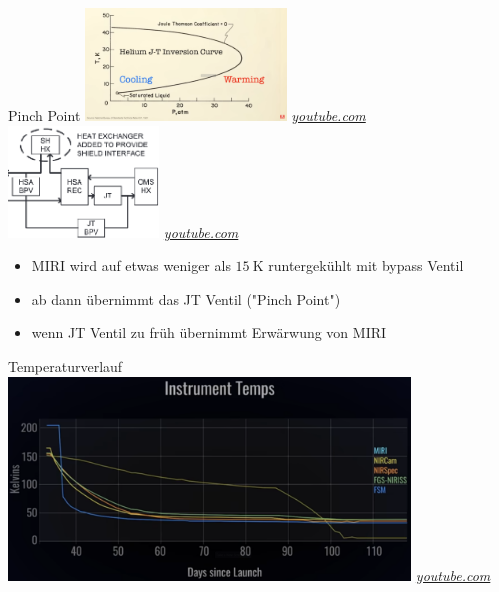 \documentclass[aspectratio=1610, 9pt, xcolor=dvipsnames]{beamer}
\begin{document}
\begin{frame}{Pinch Point}
  \centering
  \includegraphics[width=0.4\textwidth]{Plots/jt.png}
  \hspace*{12pt}\hbox{\scriptsize {\footnotesize\itshape \href{https://www.youtube.com/watch?v=FUH61gx149c}
  {youtube.com}}}
  \centering
  \includegraphics[width=0.3\textwidth]{Plots/zoom.png}
  \hspace*{12pt}\hbox{\scriptsize {\footnotesize\itshape \href{https://www.youtube.com/watch?v=FUH61gx149c}
  {youtube.com}}}
  \vspace*{0.5cm}
  \begin{itemize}
    \item MIRI wird auf etwas weniger als $\qty{15}{\kelvin}$ runtergekühlt mit bypass Ventil
    \item ab dann übernimmt das JT Ventil ("{\color{tugreen}Pinch Point}")
    \item wenn JT Ventil zu früh übernimmt {\color{tugreen}\rightarrow} Erwärwung von MIRI  
  \end{itemize}
\end{frame}
\begin{frame}{Temperaturverlauf}
  \centering
  \includegraphics[width=0.8\textwidth]{Plots/temperatur.png}
  \hspace*{12pt}\hbox{\scriptsize {\footnotesize\itshape \href{https://www.youtube.com/watch?v=FUH61gx149c}
  {youtube.com}}}
\end{frame}
\end{document}
